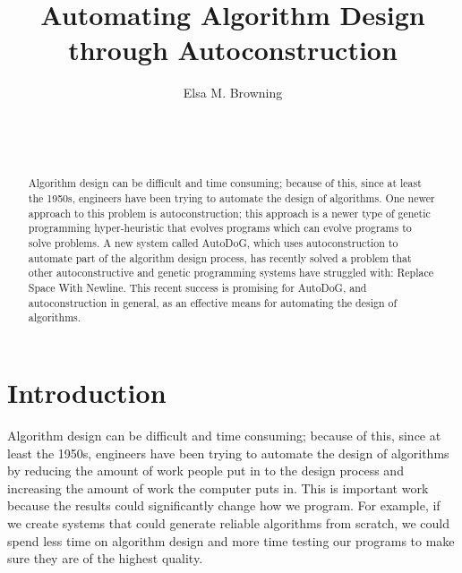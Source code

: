\documentclass{sig-alternate}
\begin{document}

\title{Automating Algorithm Design through Autoconstruction}


\author{
\alignauthor
Elsa M. Browning\\
	\\
	\\
	\\
}

\maketitle
\begin{abstract}
	Algorithm design can be difficult and time consuming; because of this, since at least the 1950s, engineers have been trying to automate the design of algorithms. One newer approach to this problem is autoconstruction; this approach is a newer type of genetic programming hyper-heuristic that evolves programs which can evolve programs to solve problems. A new system called AutoDoG, which uses autoconstruction to automate part of the algorithm design process, has recently solved a problem that other autoconstructive and genetic programming systems have struggled with: Replace Space With Newline. This recent success is promising for AutoDoG, and autoconstruction in general, as an effective means for automating the design of algorithms.
\end{abstract}


\section{Introduction}
\label{sec:introduction}
Algorithm design can be difficult and time consuming; because of this, since at least the 1950s, engineers have been trying to automate the design of algorithms by reducing the amount of work people put in to the design process and increasing the amount of work the computer puts in. This is important work because the results could significantly change how we program. For example, if we create systems that could generate reliable algorithms from scratch, we could spend less time on algorithm design and more time testing our programs to make sure they are of the highest quality.
\end{document}
